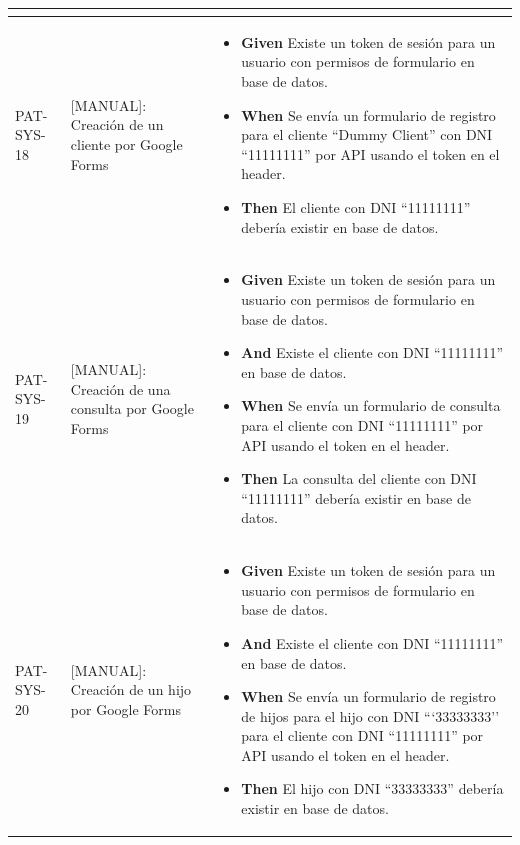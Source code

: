 \begin{longtable}{|p{1cm}|p{2.5cm}|p{12cm}|}
\begin{itemize}
    \end{itemize}
    \\
    \hline
    PAT-SYS-18& [MANUAL]: Creación de un cliente por Google Forms & 
    \begin{itemize}
        \item \textbf{Given} Existe un token de sesión para un usuario con permisos de formulario en base de datos.
        \newline
        \item \textbf{When} Se envía un formulario de registro para el cliente ``Dummy Client'' con DNI ``11111111'' por API usando el token en el header.
        \newline
        \item \textbf{Then} El cliente con DNI ``11111111'' debería existir en base de datos.
    \end{itemize}
    \\
    \hline
    PAT-SYS-19 & [MANUAL]: Creación de una consulta por Google Forms & 
    \begin{itemize}
        \item \textbf{Given} Existe un token de sesión para un usuario con permisos de formulario en base de datos.
        \item \textbf{And} Existe el cliente con DNI ``11111111'' en base de datos.
        \newline
        \item \textbf{When} Se envía un formulario de consulta para el cliente con DNI ``11111111'' por API usando el token en el header.
        \newline
        \item \textbf{Then} La consulta del cliente con DNI ``11111111'' debería existir en base de datos.
    \end{itemize}
    \\
    \hline
    PAT-SYS-20 & [MANUAL]: Creación de un hijo por Google Forms & 
    \begin{itemize}
        \item \textbf{Given} Existe un token de sesión para un usuario con permisos de formulario en base de datos.
        \item \textbf{And} Existe el cliente con DNI ``11111111'' en base de datos.
        \newline
        \item \textbf{When} Se envía un formulario de registro de hijos para el hijo con DNI ```33333333'' para el cliente con DNI ``11111111'' por API usando el token en el header.
        \newline
        \item \textbf{Then} El hijo con DNI ``33333333'' debería existir en base de datos.
    \end{itemize}
    \\
    \hline
\end{longtable}
